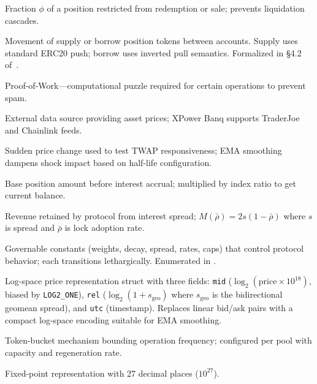 \documentclass[10pt,a4paper,twocolumn]{article}
\theoremstyle{definition}
\theoremstyle{plain}
\theoremstyle{remark}
\begin{document}
\begin{description}[style=nextline, leftmargin=2.5em, labelindent=0em, font=\normalfont\bfseries]
\item[Position Lock] Fraction $\phi$ of a position restricted from redemption or sale; prevents liquidation cascades.

\item[Position Transfer] Movement of supply or borrow position tokens between accounts. Supply uses standard ERC20 push; borrow uses inverted pull semantics. Formalized in \S4.2 of~\cite{wp}.

\item[PoW] Proof-of-Work---computational puzzle required for certain operations to prevent spam.

\item[Price Feed] External data source providing asset prices; XPower Banq supports TraderJoe and Chainlink feeds.

\item[Price Shock] Sudden price change used to test TWAP responsiveness; EMA smoothing dampens shock impact based on half-life configuration.

\item[Principal] Base position amount before interest accrual; multiplied by index ratio to get current balance.

\item[Protocol Margin] Revenue retained by protocol from interest spread; $M(\bar{\rho}) = 2s(1-\bar{\rho})$ where $s$ is spread and $\bar{\rho}$ is lock adoption rate.

\item[Protocol Parameters] Governable constants (weights, decay, spread, rates, caps) that control protocol behavior; each transitions lethargically. Enumerated in \cite[\S A]{wp}.


\item[Quote] Log-space price representation struct with three fields: \texttt{mid} ($\log_2(\text{price} \times 10^{18})$, biased by \texttt{LOG2\_ONE}), \texttt{rel} ($\log_2(1 + s_{\text{geo}})$ where $s_{\text{geo}}$ is the bidirectional geomean spread), and \texttt{utc} (timestamp). Replaces linear bid/ask pairs with a compact log-space encoding suitable for EMA smoothing.


\item[Rate Limit] Token-bucket mechanism bounding operation frequency; configured per pool with capacity and regeneration rate.

\item[Ray] Fixed-point representation with 27 decimal places ($10^{27}$).


\end{description}
\end{document}
